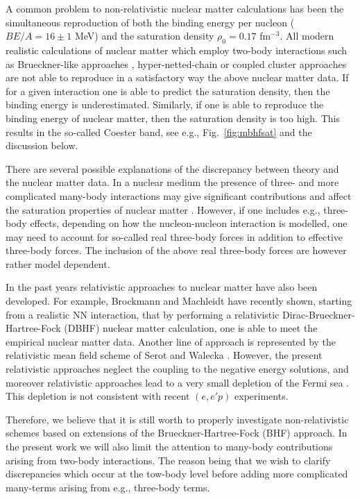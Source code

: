 A common problem to  non-relativistic nuclear matter 
calculations has been the
simultaneous reproduction of both the binding  energy per nucleon
($BE/A=16\pm 1$ MeV) and the saturation density
$\rho_0=0.17$ fm$^{-3}$. All modern realistic calculations of
nuclear matter which employ two-body interactions such as
Brueckner-like approaches  
\cite{day67,day81,rpd89,rdp91,dm92,km83,shk87,mahaux85},
hyper-netted-chain \cite{hnc} or coupled cluster \cite{cs78} approaches
are not able to reproduce in a satisfactory way 
the above nuclear matter data. If for a given interaction
one is able to predict the saturation density, then the binding energy
is underestimated. Similarly, if one is able to reproduce the
binding energy of nuclear matter, then the saturation density is
too high. This results in the so-called Coester band, 
see e.g., Fig.\ \ref{fig:mbhfsat} and the discussion below. 

There are several possible explanations of the discrepancy between 
theory and the nuclear matter data. 
In a nuclear medium the presence of three- and 
more complicated many-body 
interactions may give significant contributions and
affect the saturation properties of nuclear matter \cite{day81,wff88}.
However, if one includes e.g., three-body effects, depending on how the 
nucleon-nucleon interaction is modelled, one may need to account
for so-called real three-body forces in addition to 
effective three-body forces.  The inclusion of the above 
real three-body forces are however rather model dependent.
 
In the past years relativistic approaches to nuclear matter 
have also been developed. 
For example, Brockmann and Machleidt \cite{mac89,bm90}
have recently shown, starting from a realistic NN 
interaction,
that by performing a relativistic Dirac-Brueckner-Hartree-Fock (DBHF)
nuclear matter calculation, one is able to meet the empirical nuclear
matter data.
Another line of approach is represented by the relativistic
mean field scheme of Serot and Walecka \cite{sw86}. However, the
present relativistic approaches neglect the coupling to the
negative energy solutions, and moreover
relativistic approaches lead to a very small depletion of the
Fermi sea \cite{jm88}. 
This depletion is not consistent with recent $(e,e'p)$ 
experiments. 

Therefore, we believe that it is still worth to properly investigate
non-relativistic schemes based on extensions of the 
Brueckner-Hartree-Fock (BHF) approach. In the present work we will also
limit the attention to many-body contributions arising from two-body 
interactions. The reason being that we wish to clarify
discrepancies which occur at the tow-body 
level before adding more
complicated many-terms arising from e.g., three-body
terms.

